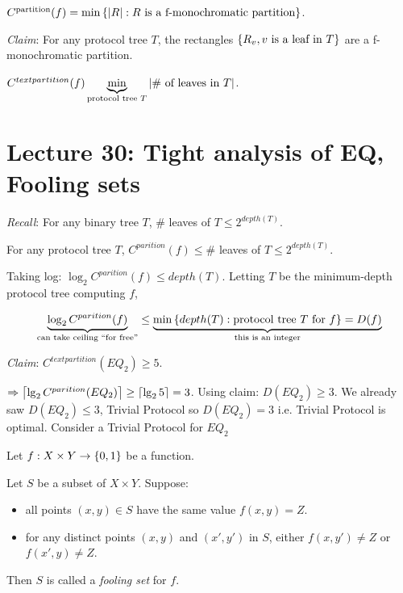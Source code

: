 \begin{definition}
    $C^{\text{partition}}(f) = \min \left \{ \left | R \right |: R \text{ is a f-monochromatic partition} \right \}$.
\end{definition}

\emph{Claim}: For any protocol tree $T$, the rectangles $\left \{ R_v, v \text{ is a leaf in } T \right \}$ are a f-monochromatic partition.

\begin{corollary}
    $C^{text{partition}}(f) \underbrace{\min}_{\text{protocol tree } T} \left | \# \text{ of leaves in } T \right |$.
\end{corollary}

\section*{Lecture 30: Tight analysis of EQ, Fooling sets}

\emph{Recall}: For any binary tree $T$, \# leaves of $T \leq 2^{depth(T)}$.

\begin{corollary}
    For any protocol tree $T$, $C^{parition}(f) \leq \#$ leaves of $T \leq 2^{depth(T)}$.
\end{corollary}

Taking log: $\log_2C^{parition}(f) \leq depth(T)$. Letting $T$ be the minimum-depth protocol tree computing $f$,

\begin{dmath*}
    \underbrace{\log_2C^{parition}(f)}_{\text{can take ceiling ``for free''}} \leq \underbrace{\min \set{depth(T): \text{protocol tree } T \text{ for } f} = D(f)}_{\text{this is an integer}}
\end{dmath*}

\emph{Claim}: $C^{text{partition}}(EQ_2) \geq 5$.

$\Rightarrow \left \lceil \lg_2 C^{parition}(EQ_2) \right \rceil \geq \left \lceil \lg_2 5 \right \rceil = 3$. Using claim: $D(EQ_2) \geq 3$. We already saw $D(EQ_2) \leq 3$, Trivial Protocol so $D(EQ_2) = 3$ i.e. Trivial Protocol is optimal. Consider a Trivial Protocol for $EQ_2$

Let $f: X \times Y \rightarrow \left \{ 0, 1 \right \}$ be a function.

\begin{definition}
    Let $S$ be a subset of $X \times Y$. Suppose:

    \begin{itemize}
        \item all points $(x, y) \in S$ have the same value $f(x, y) = Z$.
        \item for any distinct points $(x, y)$ and $(x', y')$ in $S$, either $f(x, y') \neq Z$ or $f(x', y) \neq Z$.
    \end{itemize}

    Then $S$ is called a \emph{fooling set} for $f$.
\end{definition}

